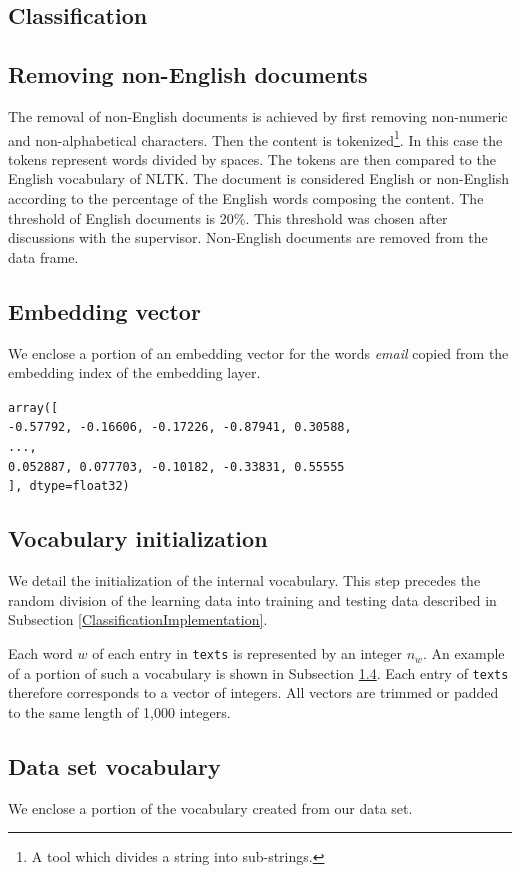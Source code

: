 \begin{appendices}
\section{Classification}
\subsection{Removing non-English documents} \label{dixRemoveNonEnglish}
The removal of non-English documents is achieved by first removing non-numeric and non-alphabetical characters. Then the content is tokenized\footnote{A tool which divides a string into sub-strings.}. In this case the tokens represent words divided by spaces. The tokens are then compared to the English vocabulary of NLTK. The document is considered English or non-English according to the percentage of the English words composing the content. The threshold of English documents is 20\%. This threshold was chosen after discussions with the supervisor. Non-English documents are removed from the data frame.

\subsection{Embedding vector} \label{dix_embeddingVector}
We enclose a portion of an embedding vector for the words \textit{email} copied from the embedding index of the embedding layer.

\texttt{array([\\
 -0.57792, -0.16606, -0.17226, -0.87941,  0.30588,\\
...,\\
  0.052887, 0.077703, -0.10182, -0.33831, 0.55555\\
], dtype=float32)}

\subsection{Vocabulary initialization}
We detail the initialization of the internal vocabulary. This step precedes the random division of the learning data into training and testing data described in Subsection \ref{ClassificationImplementation}. 

Each word $w$ of each entry in \texttt{texts} is represented by an integer $n_w$. An example of a portion of such a vocabulary is shown in Subsection \ref{DSvocabulary}. Each entry of \texttt{texts} therefore corresponds to a vector of integers. All vectors are trimmed or padded to the same length of 1,000 integers. 
\subsection{Data set vocabulary} \label{DSvocabulary}
We enclose a portion of the vocabulary created from our data set.


\end{appendices}
